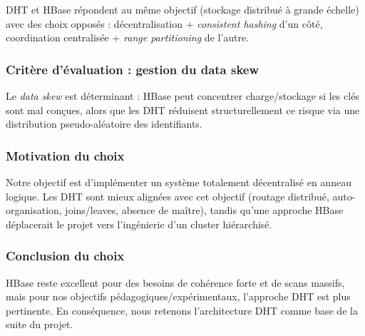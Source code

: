 DHT et HBase r\'epondent au m\^eme objectif (stockage distribu\'e \`a grande \'echelle) avec des choix oppos\'es : d\'ecentralisation + \emph{consistent hashing} d'un c\^ot\'e, coordination centralis\'ee + \emph{range partitioning} de l'autre.

\subsubsection*{Crit\`ere d'\'evaluation : gestion du data skew}

Le \emph{data skew} est d\'eterminant : HBase peut concentrer charge/stockage si les cl\'es sont mal con\c{c}ues, alors que les DHT r\'eduisent structurellement ce risque via une distribution pseudo-al\'eatoire des identifiants.

\subsubsection*{Motivation du choix}

Notre objectif est d'impl\'ementer un syst\`eme totalement d\'ecentralis\'e en anneau logique. Les DHT sont mieux align\'ees avec cet objectif (routage distribu\'e, auto-organisation, joins/leaves, absence de ma\^itre), tandis qu'une approche HBase d\'eplacerait le projet vers l'ing\'enierie d'un cluster hi\'erarchis\'e.

\subsubsection*{Conclusion du choix}

HBase reste excellent pour des besoins de coh\'erence forte et de scans massifs, mais pour nos objectifs p\'edagogiques/exp\'erimentaux, l'approche DHT est plus pertinente.
En cons\'equence, nous retenons l'architecture DHT comme base de la suite du projet.
